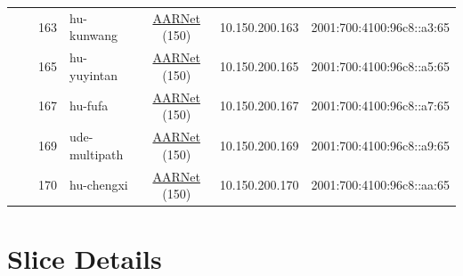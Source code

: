 \begin{small}
\begin{center}
\begin{longtable}{|c|c|c|c|c|c|c|c|}
  &  & \tiny{163} & \multicolumn{1}{|l|}{\tiny{hu-kunwang}} & \multicolumn{2}{|c|}{\tiny{\href{https://www.aarnet.edu.au/}{AARNet} (150)}} & \tiny{10.150.200.163} & \tiny{2001:700:4100:96c8::a3:65} \\* \cline{3-3}\cline{4-4}\cline{5-5}\cline{6-6}\cline{7-7}\cline{8-8}
  &  & \tiny{165} & \multicolumn{1}{|l|}{\tiny{hu-yuyintan}} & \multicolumn{2}{|c|}{\tiny{\href{https://www.aarnet.edu.au/}{AARNet} (150)}} & \tiny{10.150.200.165} & \tiny{2001:700:4100:96c8::a5:65} \\* \cline{3-3}\cline{4-4}\cline{5-5}\cline{6-6}\cline{7-7}\cline{8-8}
  &  & \tiny{167} & \multicolumn{1}{|l|}{\tiny{hu-fufa}} & \multicolumn{2}{|c|}{\tiny{\href{https://www.aarnet.edu.au/}{AARNet} (150)}} & \tiny{10.150.200.167} & \tiny{2001:700:4100:96c8::a7:65} \\* \cline{3-3}\cline{4-4}\cline{5-5}\cline{6-6}\cline{7-7}\cline{8-8}
  &  & \tiny{169} & \multicolumn{1}{|l|}{\tiny{ude-multipath}} & \multicolumn{2}{|c|}{\tiny{\href{https://www.aarnet.edu.au/}{AARNet} (150)}} & \tiny{10.150.200.169} & \tiny{2001:700:4100:96c8::a9:65} \\* \cline{3-3}\cline{4-4}\cline{5-5}\cline{6-6}\cline{7-7}\cline{8-8}
  &  & \tiny{170} & \multicolumn{1}{|l|}{\tiny{hu-chengxi}} & \multicolumn{2}{|c|}{\tiny{\href{https://www.aarnet.edu.au/}{AARNet} (150)}} & \tiny{10.150.200.170} & \tiny{2001:700:4100:96c8::aa:65} \\ \hline
\end{longtable}
\end{center}
\end{small}




\chapter{Slice Details}
\label{cha:Slice-Details}


